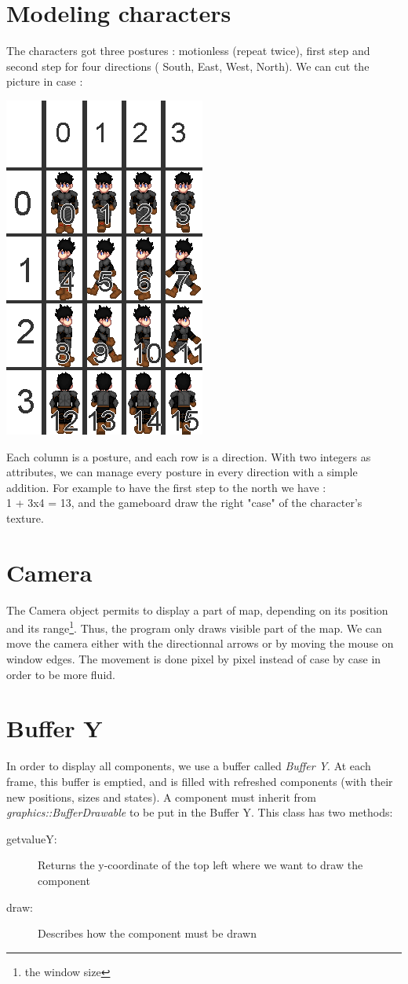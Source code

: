 \documentclass{scrreprt}
\begin{document}
	\section{Modeling characters}
	The characters got three postures : motionless (repeat twice), first step and second step for four directions ( South, East, West, North). We can cut the picture in case : 
	\begin{center}
	\includegraphics[scale=0.4]{char.png}
	\end{center}
	Each column is a posture, and each row is a direction. With two integers as attributes, we can manage every posture in every direction with a simple addition. For example to have the first step to the north we have :\\
		1 + 3x4 = 13, and the gameboard draw the right "case" of the character's texture.
		\section{Camera}
		The Camera object permits to display a part of map, depending on its position and its range\footnote{the window size}. Thus, the program only draws visible part of the map. We can move the camera either with the directionnal arrows or by moving the mouse on window edges. The movement is done pixel by pixel instead of case by case in order to be more fluid.

		\section{Buffer Y}
		In order to display all components, we use a buffer called \emph{Buffer Y}. At each frame, this buffer is emptied, and is filled with refreshed components (with their new positions, sizes and states). A component must inherit from \emph{graphics::BufferDrawable} to be put in the Buffer Y. This class has two methods:
			\begin{description}
			\item[getvalueY:]{Returns the y-coordinate of the top left where we want to draw the component}
			\item[draw:]{Describes how the component must be drawn}
			\end{description}
\end{document}

